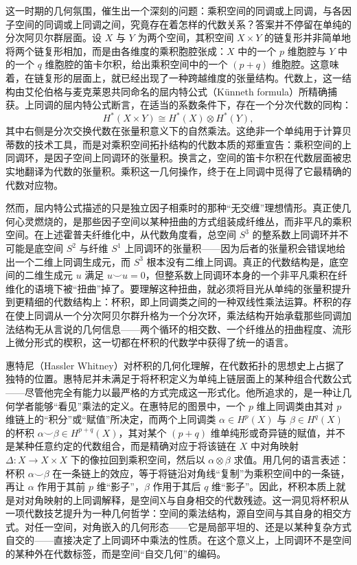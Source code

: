 \documentclass[12pt,a4paper]{article}
\begin{document}
这一时期的几何氛围，催生出一个深刻的问题：乘积空间的同调或上同调，与各因子空间的同调或上同调之间，究竟存在着怎样的代数关系？答案并不停留在单纯的分次阿贝尔群层面。设 $X$ 与 $Y$ 为两个空间，其积空间 $X \times Y$ 的链复形并非简单地将两个链复形相加，而是由各维度的乘积胞腔张成：$X$ 中的一个 $p$ 维胞腔与 $Y$ 中的一个 $q$ 维胞腔的笛卡尔积，给出乘积空间中的一个 $(p+q)$ 维胞腔。这意味着，在链复形的层面上，就已经出现了一种跨越维度的张量结构。代数上，这一结构由艾伦伯格与麦克莱恩共同命名的屈内特公式（Künneth formula）所精确捕获。上同调的屈内特公式断言，在适当的系数条件下，存在一个分次代数的同构：
$$
H^*(X \times Y) \cong H^*(X) \otimes H^*(Y),
$$
其中右侧是分次交换代数在张量积意义下的自然乘法。这绝非一个单纯用于计算贝蒂数的技术工具，而是对乘积空间拓扑结构的代数本质的郑重宣告：乘积空间的上同调环，是因子空间上同调环的张量积。换言之，空间的笛卡尔积在代数层面被忠实地翻译为代数的张量积。乘积这一几何操作，终于在上同调中觅得了它最精确的代数对应物。

然而，屈内特公式描述的只是独立因子相乘时的那种“无交缠”理想情形。真正使几何心灵燃烧的，是那些因子空间以某种扭曲的方式组装成纤维丛，而非平凡的乘积空间。在上述霍普夫纤维化中，从代数角度看，总空间 $S^3$ 的整系数上同调环并不可能是底空间 $S^2$ 与纤维 $S^1$ 上同调环的张量积——因为后者的张量积会错误地给出一个二维上同调生成元，而 $S^3$ 根本没有二维上同调。真正的代数结构是，底空间的二维生成元 $u$ 满足 $u \smile u = 0$，但整系数上同调环本身的一个非平凡乘积在纤维化的语境下被“扭曲”掉了。要理解这种扭曲，就必须将目光从单纯的张量积提升到更精细的代数结构上：杯积，即上同调类之间的一种双线性乘法运算。杯积的存在使上同调从一个分次阿贝尔群升格为一个分次环，乘法结构开始承载那些同调加法结构无从言说的几何信息——两个循环的相交数、一个纤维丛的扭曲程度、流形上微分形式的楔积，这一切都在杯积的代数学中获得了统一的语言。

惠特尼（Hassler Whitney）对杯积的几何化理解，在代数拓扑的思想史上占据了独特的位置。惠特尼并未满足于将杯积定义为单纯上链层面上的某种组合代数公式——尽管他完全有能力以最严格的方式完成这一形式化。他所追求的，是一种让几何学者能够“看见”乘法的定义。在惠特尼的图景中，一个 $p$ 维上同调类由其对 $p$ 维链上的“积分”或“赋值”所决定，而两个上同调类 $\alpha \in H^p(X)$ 与 $\beta \in H^q(X)$ 的杯积 $\alpha \smile \beta \in H^{p+q}(X)$，其对某个 $(p+q)$ 维单纯形或奇异链的赋值，并不是某种任意约定的代数组合，而是精确对应于将该链在 $X$ 中对角映射 $\Delta: X \to X \times X$ 下的像拉回到乘积空间，然后以 $\alpha \otimes \beta$ 求值。用几何的语言表述：杯积 $\alpha \smile \beta$ 在一条链上的效应，等于将链沿对角线“复制”为乘积空间中的一条链，再让 $\alpha$ 作用于其前 $p$ 维“影子”，$\beta$ 作用于其后 $q$ 维“影子”。因此，杯积本质上就是对对角映射的上同调解释，是空间X与自身相交的代数残迹。这一洞见将杯积从一项代数技艺提升为一种几何哲学：空间的乘法结构，源自空间与其自身的相交方式。对任一空间，对角嵌入的几何形态——它是局部平坦的、还是以某种复杂方式自交的——直接决定了上同调环中乘法的性质。在这个意义上，上同调环不是空间的某种外在代数标签，而是空间“自交几何”的编码。
\end{document}
